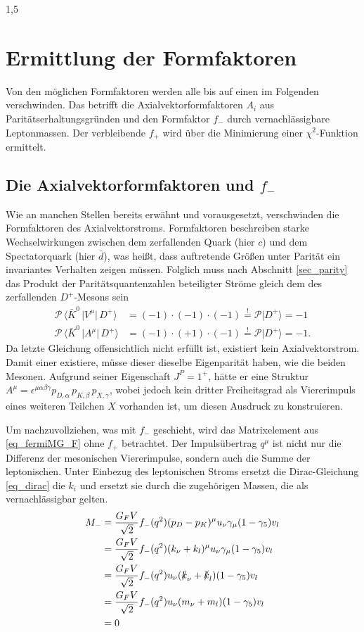 \documentclass[11pt,a4paper,twoside]{report}
\begin{document}
\begin{spacing}{1,5}
\section{Ermittlung der Formfaktoren}
Von den möglichen Formfaktoren werden alle bis auf einen im Folgenden verschwinden. Das betrifft die Axialvektorformfaktoren $A_i$ aus 
Paritätserhaltungsgründen und den Formfaktor $f_-$ durch vernachlässigbare Leptonmassen. Der verbleibende $f_+$ wird über die Minimierung einer
$\chi^2$-Funktion ermittelt.

\subsection{Die Axialvektorformfaktoren und $f_-$}
Wie an manchen Stellen bereits erwähnt und vorausgesetzt, verschwinden die Formfaktoren des Axialvektorstroms. Formfaktoren beschreiben starke 
Wechselwirkungen zwischen dem zerfallenden Quark (hier $c$) und dem Spectatorquark (hier $\bar d$), was heißt, dass auftretende Größen unter Parität
ein invariantes Verhalten zeigen müssen. Folglich muss nach Abschnitt \ref{sec_parity} das Produkt der Paritätsquantenzahlen beteiligter Ströme gleich dem
des zerfallenden $D^+$-Mesons sein
\begin{align}
 \mathcal{P} \, \big\langle\bar K^0\,\big|V^\mu|\,D^+\big\rangle &= (-1)\cdot(-1)\cdot(-1) \stackrel{!}{=} \mathcal{P} \big|D^+\big\rangle = -1 \nonumber \\
 \mathcal{P} \, \big\langle\bar K^0\,\big|A^\mu|\,D^+\big\rangle &= (-1)\cdot(+1)\cdot(-1) \stackrel{!}{=} \mathcal{P} \big|D^+\big\rangle = -1. \nonumber
\end{align}
Da letzte Gleichung offensichtlich nicht erfüllt ist, existiert kein Axialvektorstrom. Damit einer existiere, müsse dieser dieselbe Eigenparität haben,
wie die beiden Mesonen. Aufgrund seiner Eigenschaft $J^P = 1^+$, hätte er eine Struktur 
$A^\mu = \epsilon^{\mu \alpha \beta \gamma}p_{D,\alpha}\,p_{K,\beta}\,p_{X,\gamma}$, wobei jedoch kein dritter Freiheitsgrad als Viererimpuls eines
weiteren Teilchen $X$ vorhanden ist, um diesen Ausdruck zu konstruieren.

Um nachzuvollziehen, was mit $f_-$ geschieht, wird das Matrixelement aus \eqref{eq_fermiMG_F} ohne $f_+$ betrachtet. Der Impulsübertrag $q^\mu$ ist nicht
nur die Differenz der mesonischen Viererimpulse, sondern auch die Summe der leptonischen. Unter Einbezug des leptonischen Stroms ersetzt die Dirac-Gleichung
\eqref{eq_dirac} die $k_i$ und ersetzt sie durch die zugehörigen Massen, die als vernachlässigbar gelten.
\begin{align}
 M_- &= \frac{G_F V}{\sqrt{2}} f_-(q^2)(p_D-p_K)^\mu u_\nu \gamma_\mu(1-\gamma_5)v_l\nonumber\\
 &= \frac{G_F V}{\sqrt{2}} f_-(q^2)(k_\nu+k_l)^\mu u_\nu \gamma_\mu(1-\gamma_5)v_l\nonumber\\
 &=\frac{G_F V}{\sqrt{2}} f_-(q^2)u_\nu (\slashed{k}_\nu + \slashed{k}_l) (1-\gamma_5)v_l\nonumber\\
 &=\frac{G_F V}{\sqrt{2}} f_-(q^2)u_\nu (m_\nu + m_l) (1-\gamma_5)v_l\nonumber \\
 &=0
 \end{align}


\end{spacing}
\end{document}
